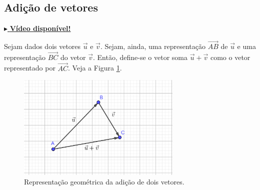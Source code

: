 \subsection{Adição de vetores}

\begin{flushright}
  \href{https://archive.org/details/adicao-de-vetores}{$\blacktriangleright$ \bf Vídeo disponível!}
\end{flushright}

Sejam dados dois vetores $\vec{u}$ e $\vec{v}$. Sejam, ainda, uma representação $\overrightarrow{AB}$ de $\vec{u}$ e uma representação $\overrightarrow{BC}$ do vetor $\vec{v}$. Então, define-se o vetor soma $\vec{u}+\vec{v}$ como o vetor representado por $\overrightarrow{AC}$. Veja a Figura \ref{fig:vadicao}.

\begin{figure}[H]
  \centering
  \includegraphics[width=0.7\textwidth]{./cap_vetor/dados/fig_vadicao/fig_vadicao}
  \caption{Representação geométrica da adição de dois vetores.}
  \label{fig:vadicao}
\end{figure}

